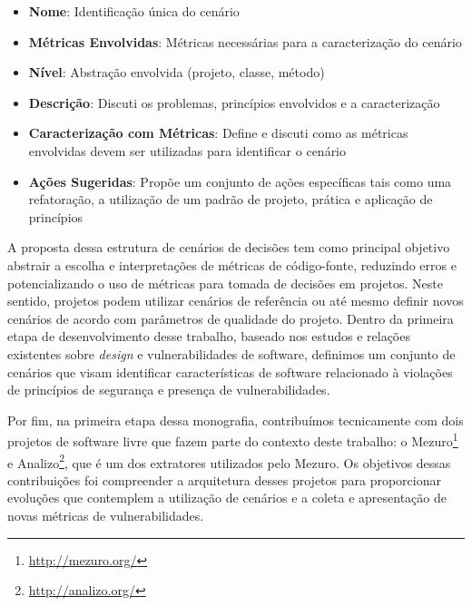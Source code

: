 \begin{itemize}
\item \textbf{Nome}: Identificação única do cenário
\item \textbf{Métricas Envolvidas}: Métricas necessárias para a caracterização do cenário
\item \textbf{Nível}: Abstração envolvida (projeto, classe, método)
\item \textbf{Descrição}: Discuti os problemas, princípios envolvidos e a caracterização
\item \textbf{Caracterização com Métricas}: Define e discuti como as métricas envolvidas devem ser utilizadas para identificar o cenário
\item \textbf{Ações Sugeridas}: Propõe um conjunto de ações específicas tais como uma refatoração, a utilização de um padrão de projeto, prática e aplicação de princípios
\end{itemize}

A proposta dessa estrutura de cenários de decisões tem como principal objetivo abstrair a escolha e interpretações de métricas de código-fonte, reduzindo erros e potencializando o uso de métricas para tomada de decisões em projetos. Neste sentido, projetos podem utilizar cenários de referência ou até mesmo definir novos cenários de acordo com parâmetros de qualidade do projeto. Dentro da primeira etapa de desenvolvimento desse trabalho, baseado nos estudos e relações existentes sobre \emph{design} e vulnerabilidades de software, definimos um conjunto de cenários que visam identificar características de software relacionado à violações de princípios de segurança e presença de vulnerabilidades.

Por fim, na primeira etapa dessa monografia, contribuímos tecnicamente com dois projetos de software livre que fazem parte do contexto deste trabalho: o Mezuro\footnote{\url{http://mezuro.org/}} e Analizo\footnote{\url{http://analizo.org/}}, que é um dos extratores utilizados pelo Mezuro. Os objetivos dessas contribuições foi compreender a arquitetura desses projetos para proporcionar evoluções que contemplem a utilização de cenários e a coleta e apresentação de novas métricas de vulnerabilidades.
